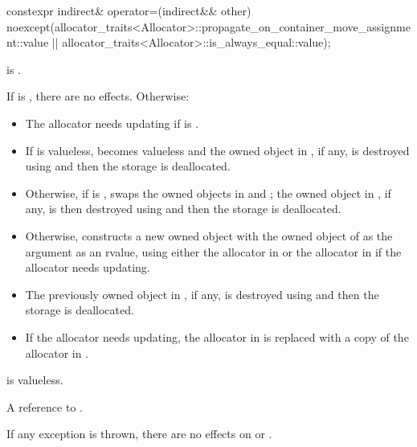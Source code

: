 %
\begin{itemdecl}
constexpr indirect& operator=(indirect&& other)
  noexcept(allocator_traits<Allocator>::propagate_on_container_move_assignment::value ||
           allocator_traits<Allocator>::is_always_equal::value);
\end{itemdecl}

\begin{itemdescr}
\pnum
\mandates
{} is .

\pnum
\effects
If  is , there are no effects.
Otherwise:

\begin{itemize}
\item
The allocator needs updating if
is .

\item
If  is valueless,
 becomes valueless and
the owned object in , if any,
is destroyed using  and
then the storage is deallocated.

\item
Otherwise,
if  is ,
swaps the owned objects in  and ;
the owned object in , if any,
is then destroyed using  and
then the storage is deallocated.

\item
Otherwise,
constructs a new owned object with
the owned object of  as the argument as an rvalue,
using either
the allocator in  or
the allocator in 
if the allocator needs updating.

\item
The previously owned object in , if any,
is destroyed using  and
then the storage is deallocated.

\item
If the allocator needs updating,
the allocator in  is replaced with
a copy of the allocator in .
\end{itemize}

\pnum
\ensures
{} is valueless.

\pnum
\returns
A reference to .

\pnum
\remarks
If any exception is thrown,
there are no effects on  or .
\end{itemdescr}

